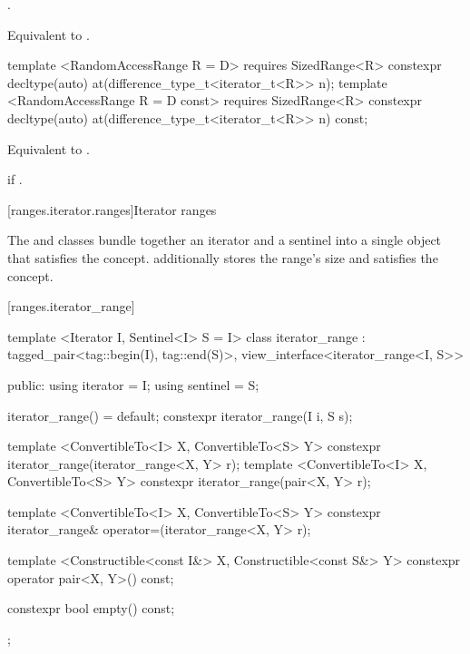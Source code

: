 \begin{itemdescr}
\pnum
\requires {}.

\pnum
\returns Equivalent to .
\end{itemdescr}

%
\begin{itemdecl}
template <RandomAccessRange R = D>
    requires SizedRange<R>
  constexpr decltype(auto) at(difference_type_t<iterator_t<R>> n);
template <RandomAccessRange R = D const>
    requires SizedRange<R>
  constexpr decltype(auto) at(difference_type_t<iterator_t<R>> n) const;
\end{itemdecl}

\begin{itemdescr}
\pnum
\returns Equivalent to .

\pnum
\throws {} if .
\end{itemdescr}

[ranges.iterator.ranges]{Iterator ranges}

\pnum
The  and  classes bundle together an
iterator and a sentinel into a single object that satisfies the  concept.
 additionally stores the range's size and satisfies the
 concept.

[ranges.iterator_range]{}

%
\begin{codeblock}
template <Iterator I, Sentinel<I> S = I>
class iterator_range
  : tagged_pair<tag::begin(I), tag::end(S)>,
    view_interface<iterator_range<I, S>> {
public:
  using iterator = I;
  using sentinel = S;

  iterator_range() = default;
  constexpr iterator_range(I i, S s);

  template <ConvertibleTo<I> X, ConvertibleTo<S> Y>
    constexpr iterator_range(iterator_range<X, Y> r);
  template <ConvertibleTo<I> X, ConvertibleTo<S> Y>
    constexpr iterator_range(pair<X, Y> r);

  template <ConvertibleTo<I> X, ConvertibleTo<S> Y>
    constexpr iterator_range& operator=(iterator_range<X, Y> r);

  template <Constructible<const I&> X, Constructible<const S&> Y>
    constexpr operator pair<X, Y>() const;

  constexpr bool empty() const;
};
\end{codeblock}

